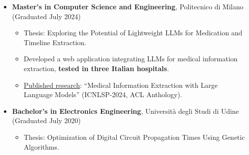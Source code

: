 \documentclass[a4paper,9pt]{article}
\newcommand{\cvsection}[2]{
    \vspace{0.3cm} %
    \noindent {\large \textbf{#1}} %
    \begin{itemize}
        \renewcommand{\labelitemi}{}
        \small #2 %
    \end{itemize}
}
\begin{document}
\cvsection{Education}{
    \item \textbf{Master's in Computer Science and Engineering}, Politecnico di Milano (Graduated July 2024)
    \begin{itemize}
        \item Thesis: Exploring the Potential of Lightweight LLMs for Medication and Timeline Extraction.
        \item Developed a web application integrating LLMs for medical information extraction, \textbf{tested in three Italian hospitals}.
        \item \href{https://aclanthology.org/2024.icnlsp-1.47/}{Published research}: ``Medical Information Extraction with Large Language Models'' (ICNLSP-2024, ACL Anthology).
    \end{itemize}
    \item \textbf{Bachelor's in Electronics Engineering}, Università degli Studi di Udine (Graduated July 2020)
    \begin{itemize}
        \item Thesis: Optimization of Digital Circuit Propagation Times Using Genetic Algorithms.
    \end{itemize}
}
\end{document}
